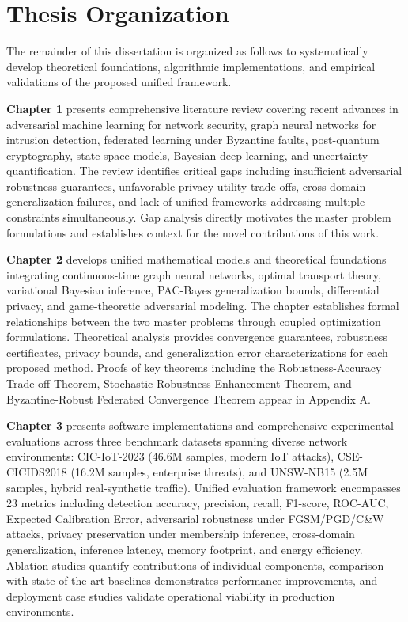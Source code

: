 \section*{Thesis Organization}

The remainder of this dissertation is organized as follows to systematically develop theoretical foundations, algorithmic implementations, and empirical validations of the proposed unified framework.

\textbf{Chapter 1} presents comprehensive literature review covering recent advances in adversarial machine learning for network security, graph neural networks for intrusion detection, federated learning under Byzantine faults, post-quantum cryptography, state space models, Bayesian deep learning, and uncertainty quantification. The review identifies critical gaps including insufficient adversarial robustness guarantees, unfavorable privacy-utility trade-offs, cross-domain generalization failures, and lack of unified frameworks addressing multiple constraints simultaneously. Gap analysis directly motivates the master problem formulations and establishes context for the novel contributions of this work.

\textbf{Chapter 2} develops unified mathematical models and theoretical foundations integrating continuous-time graph neural networks, optimal transport theory, variational Bayesian inference, PAC-Bayes generalization bounds, differential privacy, and game-theoretic adversarial modeling. The chapter establishes formal relationships between the two master problems through coupled optimization formulations. Theoretical analysis provides convergence guarantees, robustness certificates, privacy bounds, and generalization error characterizations for each proposed method. Proofs of key theorems including the Robustness-Accuracy Trade-off Theorem, Stochastic Robustness Enhancement Theorem, and Byzantine-Robust Federated Convergence Theorem appear in Appendix A.

\textbf{Chapter 3} presents software implementations and comprehensive experimental evaluations across three benchmark datasets spanning diverse network environments: CIC-IoT-2023 (46.6M samples, modern IoT attacks), CSE-CICIDS2018 (16.2M samples, enterprise threats), and UNSW-NB15 (2.5M samples, hybrid real-synthetic traffic). Unified evaluation framework encompasses 23 metrics including detection accuracy, precision, recall, F1-score, ROC-AUC, Expected Calibration Error, adversarial robustness under FGSM/PGD/C\&W attacks, privacy preservation under membership inference, cross-domain generalization, inference latency, memory footprint, and energy efficiency. Ablation studies quantify contributions of individual components, comparison with state-of-the-art baselines demonstrates performance improvements, and deployment case studies validate operational viability in production environments.

